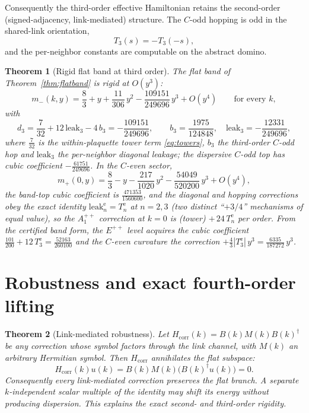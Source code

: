 \documentclass[11pt]{article}
\newtheorem{theorem}{Theorem}[section]
\begin{document}
Consequently the third-order effective Hamiltonian retains the second-order
(signed-adjacency, link-mediated) structure. The $C$-odd hopping is odd in the
shared-link orientation,
\[
T_3(s)=-T_3(-s),
\]
and the per-neighbor constants are computable on the abstract domino.

\begin{theorem}[Rigid flat band at third order]\label{thm:thirdorder}
The flat band of Theorem~\ref{thm:flatband} is rigid at $O(y^3)$:
\begin{equation}
m_-(k,y)=\frac83+y+\frac{11}{306}\,y^2-\frac{109151}{249696}\,y^3+O(y^4)
\qquad\text{for every }k,
\end{equation}
with
\begin{equation}
d_3=\frac{7}{32}+12\,\mathrm{leak}_3-4\,b_3=-\frac{109151}{249696},
\qquad
b_3=\frac{1975}{124848},\quad
\mathrm{leak}_3=-\frac{12331}{249696},
\end{equation}
where $\tfrac{7}{32}$ is the within-plaquette tower term \eqref{eq:towers},
$b_3$ the third-order $C$-odd hop and $\mathrm{leak}_3$ the per-neighbor
diagonal leakage; the dispersive $C$-odd top has cubic coefficient
$-\tfrac{61751}{249696}$. In the $C$-even sector,
\begin{equation}
m_+(0,y)=\frac83-y-\frac{217}{1020}\,y^2-\frac{54049}{520200}\,y^3+O(y^4),
\end{equation}
the band-top cubic coefficient is $\tfrac{471353}{1560600}$, and the diagonal
and hopping corrections obey the exact identity
$\mathrm{leak}^{\mathrm e}_n=T^{\mathrm e}_n$ at $n=2,3$ (two distinct
``$+3/4$'' mechanisms of equal value), so the $A_1^{++}$ correction at $k=0$
is (tower) $+\,24\,T^{\mathrm e}_n$ per order. From the certified band form,
the $E^{++}$ level acquires the cubic coefficient
$\tfrac{101}{200}+12\,T_3^{\mathrm e}=\tfrac{52163}{260100}$ and the
$C$-even curvature the correction
$+\tfrac43|T_3^{\mathrm e}|\,y^3=\tfrac{6335}{187272}\,y^3$.
\end{theorem}

\section{Robustness and exact fourth-order lifting}
\label{sec:robust}

\begin{theorem}[Link-mediated robustness]\label{thm:robust}
Let $H_{\mathrm{corr}}(k)=B(k)M(k)B(k)^\dagger$ be any correction whose
symbol factors through the link channel, with $M(k)$ an arbitrary Hermitian
symbol. Then $H_{\mathrm{corr}}$ annihilates the flat subspace:
\[
H_{\mathrm{corr}}(k)u(k)
=B(k)M(k)\bigl(B(k)^\dagger u(k)\bigr)=0.
\]
Consequently every link-mediated correction preserves the flat branch. A
separate $k$-independent scalar multiple of the identity may shift its energy
without producing dispersion. This explains the exact
second- and third-order rigidity.
\end{theorem}
\end{document}
